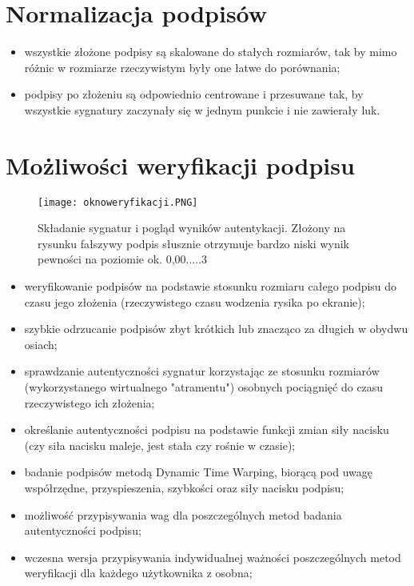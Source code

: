 \documentclass[notitlepage, oneside]{report}
\begin{document}
 \section*{Normalizacja podpisów}
\begin{itemize}
  \item wszystkie złożone podpisy są skalowane do stałych rozmiarów, tak by mimo różnic w rozmiarze rzeczywistym były one łatwe do porównania;
  \item podpisy po złożeniu są odpowiednio centrowane i przesuwane tak, by wszystkie sygnatury zaczynały się w jednym punkcie i nie zawierały luk.
 \end{itemize}
\section*{Możliwości weryfikacji podpisu}

 \begin{figure}
\centering
\texttt{[image: oknoweryfikacji.PNG]}
\caption{Składanie sygnatur i pogląd wyników autentykacji. Złożony na rysunku fałszywy podpis słusznie otrzymuje bardzo niski wynik pewności na poziomie ok. 0,00.....3}
\label{rys:Okno weryfikacji sygnatury}
\end{figure}

\begin{itemize}
  \item weryfikowanie podpisów na podstawie stosunku rozmiaru całego podpisu do czasu jego złożenia (rzeczywistego czasu wodzenia rysika po ekranie);
  \item szybkie odrzucanie podpisów zbyt krótkich lub znacząco za długich w obydwu osiach;
  \item sprawdzanie autentyczności sygnatur korzystając ze stosunku rozmiarów (wykorzystanego wirtualnego "atramentu") osobnych pociągnięć do czasu rzeczywistego ich złożenia;
  \item określanie autentyczności podpisu na podstawie funkcji zmian siły nacisku (czy siła nacisku maleje, jest stała czy rośnie w czasie);
  \item badanie podpisów metodą Dynamic Time Warping, biorącą pod uwagę współrzędne, przyspieszenia, szybkości oraz siły nacisku podpisu;
  \item możliwość przypisywania wag dla poszczególnych metod badania autentyczności podpisu;
  \item wczesna wersja przypisywania indywidualnej ważności poszczególnych metod weryfikacji dla każdego użytkownika z osobna;
 \end{itemize}
\end{document}
